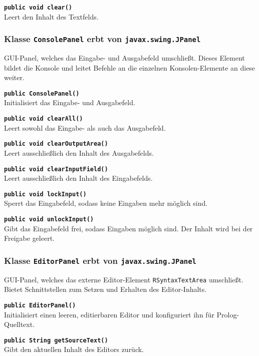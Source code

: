 \documentclass[parskip=full,11pt,twoside]{scrartcl}
\begin{document}
\textbf{\texttt{public void clear()}}\\
Leert den Inhalt des Textfelds.

\subsubsection{Klasse \texttt{ConsolePanel} erbt von \texttt{javax.swing.JPanel}}

GUI-Panel, welches das Eingabe- und Ausgabefeld umschließt. Dieses Element bildet die Konsole und leitet Befehle an die einzelnen Konsolen-Elemente an diese weiter.

\textbf{\texttt{public ConsolePanel()}}\\
Initialisiert das Eingabe- und Ausgabefeld.

\textbf{\texttt{public void clearAll()}}\\
Leert sowohl das Eingabe- als auch das Ausgabefeld.

\textbf{\texttt{public void clearOutputArea()}}\\
Leert ausschließlich den Inhalt des Ausgabefelds.

\textbf{\texttt{public void clearInputField()}}\\
Leert ausschließlich den Inhalt des Eingabefelds.

\textbf{\texttt{public void lockInput()}}\\
Sperrt das Eingabefeld, sodass keine Eingaben mehr möglich sind.

\textbf{\texttt{public void unlockInput()}}\\
Gibt das Eingabefeld frei, sodass Eingaben möglich sind. Der Inhalt wird bei der Freigabe geleert.

\subsubsection{Klasse \texttt{EditorPanel} erbt von \texttt{javax.swing.JPanel}}

GUI-Panel, welches das externe Editor-Element \texttt{RSyntaxTextArea} umschließt. Bietet Schnittstellen zum Setzen und Erhalten des Editor-Inhalts.

\textbf{\texttt{public EditorPanel()}}\\
Initialisiert einen leeren, editierbaren Editor und konfiguriert ihn für Prolog-Quelltext.

\textbf{\texttt{public String getSourceText()}}\\
Gibt den aktuellen Inhalt des Editors zurück.
\end{document}
